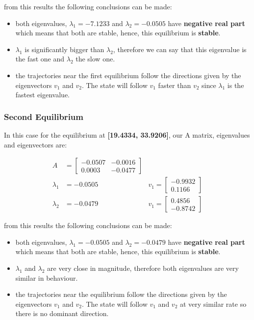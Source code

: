 \documentclass[12pt,letterpaper]{article}
\begin{document}
from this results the following conclusions can be made:
\begin{itemize}
    \item both eigenvalues, $\lambda_1 = -7.1233$ and $\lambda_2 = -0.0505$ have \textbf{negative real part} which means that both are stable, hence, this equilibrium is \textbf{stable}.
    \item $\lambda_1$ is significantly bigger than $\lambda_2$, therefore we can say that this eigenvalue is the fast one and $\lambda_2$ the slow one.
    \item the trajectories near the first equilibrium follow the directions given by the eigenvectors $v_1$ and $v_2$. The state will follow $v_1$ faster than $v_2$ since $\lambda_1$ is the fastest eigenvalue.
\end{itemize}

\subsubsection{Second Equilibrium}
In this case for the equilibrium at \textbf{[19.4334, 33.9206]}, our A matrix, eigenvalues and eigenvectors are:

\begin{align}
    A &= \begin{bmatrix}
        -0.0507 & -0.0016 \\
        0.0003 & -0.0477
    \end{bmatrix} & \\
    \lambda_1 &= -0.0505 &v_1 = \begin{bmatrix}
        -0.9932 \\0.1166
    \end{bmatrix} \\ 
    \lambda_2 &= -0.0479 &v_1 = \begin{bmatrix}
        0.4856 \\-0.8742
    \end{bmatrix}
\end{align}

from this results the following conclusions can be made:
\begin{itemize}
    \item both eigenvalues, $\lambda_1 = -0.0505$ and $\lambda_2 = -0.0479$ have \textbf{negative real part} which means that both are stable, hence, this equilibrium is \textbf{stable}.
    \item $\lambda_1$ and $\lambda_2$ are very close in magnitude, therefore both eigenvalues are very similar in behaviour.
    \item the trajectories near the equilibrium follow the directions given by the eigenvectors $v_1$ and $v_2$. The state will follow $v_1$ and $v_2$ at very similar rate so there is no dominant direction.
\end{itemize}
\end{document}
